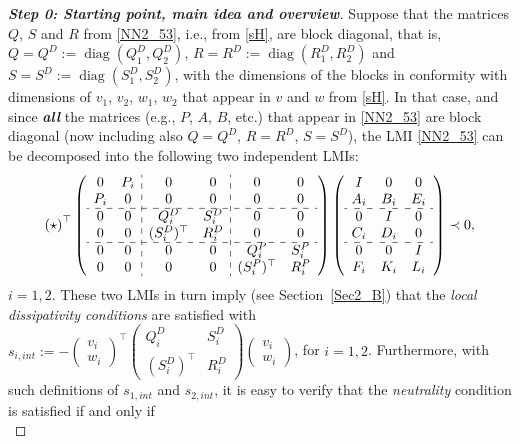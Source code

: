 \documentclass[11pt,a4paper,oneside,DIV=12,headings=small]{scrartcl}
\newcommand{\diag}{\operatorname{diag}}
\theoremstyle{plain}
\begin{document}
\begin{proof}[\textbf{Step 0: \emph{Starting point, main idea and overview}}]
Suppose that the matrices $Q$, $S$ and $R$ from \eqref{NN2_53}, i.e., from \eqref{sH}, are block diagonal, that is, $Q=Q^D:=\diag(Q_1^D,Q_2^D)$, $R=R^D:=\diag(R_1^D,R_2^D)$ and $S=S^D:=\diag(S_1^D,S_2^D)$, with the dimensions of the blocks in conformity with dimensions of $v_1$, $v_2$, $w_1$, $w_2$ that appear in $v$ and $w$ from \eqref{sH}. In that case, and since \textbf{\emph{all}} the matrices (e.g., $P$, $A$, $B$, etc.) that appear in \eqref{NN2_53} are block diagonal (now including also $Q=Q^D$, $R=R^D$, $S=S^D$), the LMI \eqref{NN2_53} can be decomposed into the following two independent LMIs:
\begin{equation}
\label{separateLMIs_53}
\left(\star \right)^\top
\left(\begin{array}{cc:cc:cc} 0 & P_i & 0 & 0 & 0 & 0\\ 
P_i & 0 & 0 & 0 & 0 & 0 \\ \hdashline 
0 & 0 & Q^D_i & S^D_i & 0 & 0\\ 
0 & 0 & (S^D_i)^\top & R^D_i  & 0 & 0 \\ \hdashline
0 & 0 & 0 & 0 & Q^P_i & S^P_i \\
0 & 0 & 0 & 0 & (S^P_i)^\top & R^P_i 
 \end{array}\right)
\left(\begin{array}{ccc} I & 0 & 0 \\ A_i & B_i & E_i \\ \hdashline 0 & I & 0 \\ C_i & D_i & 0 \\ \hdashline 0 & 0 & I \\ F_i & K_i & L_i \end{array}\right) \prec 0,
\end{equation}
$i=1,2$. These two LMIs in turn imply (see Section~\ref{Sec2_B}) that the \emph{local dissipativity conditions} are satisfied with $s_{i,int}:=-\begin{pmatrix}v_i \\ w_i\end{pmatrix}^\top\begin{pmatrix} Q_i^D & S_i^D \\ (S_i^D)^\top & R_i^D \end{pmatrix}\begin{pmatrix}v_i \\ w_i\end{pmatrix}$, for $i=1,2$. Furthermore, with such definitions of $s_{1,int}$ and $s_{2,int}$, it is easy to verify that the \emph{neutrality} condition  is satisfied if and only if
\begin{equation}

\end{equation}
\end{proof}
\end{document}
